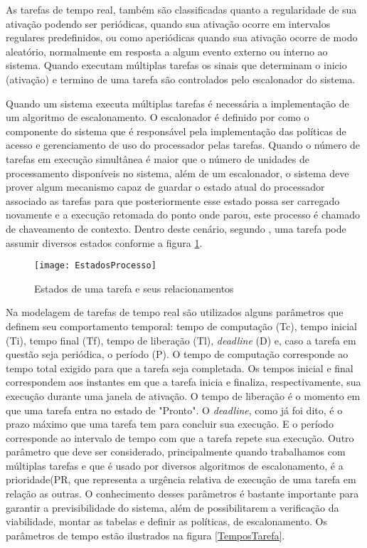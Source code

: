 As tarefas de tempo real, também são classificadas quanto a regularidade de sua ativação podendo ser periódicas, quando sua ativação ocorre em intervalos regulares predefinidos, ou como aperiódicas quando sua ativação ocorre de modo aleatório, normalmente em resposta a algum evento externo ou interno ao sistema. Quando executam múltiplas tarefas os sinais que determinam o inicio (ativação) e termino de uma tarefa são controlados pelo escalonador do sistema.

Quando um sistema executa múltiplas tarefas é necessária a implementação de um algoritmo de escalonamento. O escalonador é definido por \cite{Farines2000} como o componente do sistema que é responsável pela implementação das políticas de acesso e gerenciamento de uso do processador pelas tarefas. Quando o número de tarefas em execução simultânea é maior que o número de unidades de processamento disponíveis no sistema, além de um escalonador, o sistema deve prover algum mecanismo capaz de guardar o estado atual do processador associado as tarefas para que posteriormente esse estado possa ser carregado novamente e a execução retomada do ponto onde parou, este processo é chamado de chaveamento de contexto. Dentro deste cenário, segundo \cite{Tanenbaum2009}, uma tarefa pode assumir diversos estados conforme a figura \ref{EstadoProcesso}.

\begin{figure}[!htb]
    \centering
    \texttt{[image: EstadosProcesso]}
    \caption{Estados de uma tarefa e seus relacionamentos}
    \label{EstadoProcesso}
\end{figure}

Na modelagem de tarefas de tempo real são utilizados alguns parâmetros que definem seu comportamento temporal: tempo de computação (Tc), tempo inicial (Ti), tempo final (Tf), tempo de liberação (Tl), \textit{deadline} (D) e, caso a tarefa em questão seja periódica, o período (P). O tempo de computação corresponde ao tempo total exigido para que a tarefa seja completada. Os tempos inicial e final correspondem aos instantes em que a tarefa inicia e finaliza, respectivamente, sua execução durante uma janela de ativação. O tempo de liberação é o momento em que uma tarefa entra no estado de "Pronto". O \textit{deadline}, como já foi dito, é o prazo máximo que uma tarefa tem para concluir sua execução. E o período corresponde ao intervalo de tempo com que a tarefa repete sua execução. Outro parâmetro que deve ser considerado, principalmente quando trabalhamos com múltiplas tarefas e que é usado por diversos algoritmos de escalonamento, é a prioridade(PR, que representa a urgência relativa de execução de uma tarefa em relação as outras. O conhecimento desses parâmetros é bastante importante para garantir a previsibilidade do sistema, além de possibilitarem a verificação da viabilidade, montar as tabelas e definir as políticas, de escalonamento. Os parâmetros de tempo estão ilustrados na figura \ref{TemposTarefa}.
 
